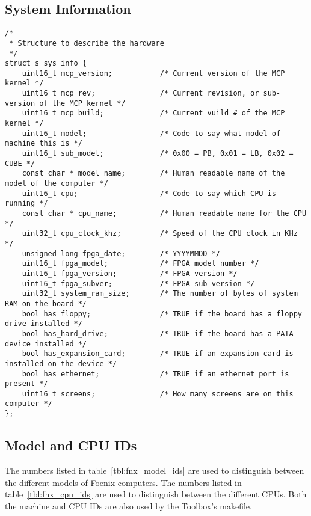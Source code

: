 \subsection*{System Information}
\begin{lstlisting}
/*
 * Structure to describe the hardware
 */
struct s_sys_info {
    uint16_t mcp_version;     		/* Current version of the MCP kernel */
    uint16_t mcp_rev;         		/* Current revision, or sub-version of the MCP kernel */
    uint16_t mcp_build;       		/* Current vuild # of the MCP kernel */
    uint16_t model;           		/* Code to say what model of machine this is */
    uint16_t sub_model;         	/* 0x00 = PB, 0x01 = LB, 0x02 = CUBE */
    const char * model_name;        /* Human readable name of the model of the computer */
    uint16_t cpu;             		/* Code to say which CPU is running */
    const char * cpu_name;          /* Human readable name for the CPU */
    uint32_t cpu_clock_khz;     	/* Speed of the CPU clock in KHz */
    unsigned long fpga_date;        /* YYYYMMDD */    
    uint16_t fpga_model;       		/* FPGA model number */
    uint16_t fpga_version;    		/* FPGA version */
    uint16_t fpga_subver;     		/* FPGA sub-version */
    uint32_t system_ram_size;		/* The number of bytes of system RAM on the board */
    bool has_floppy;                /* TRUE if the board has a floppy drive installed */
    bool has_hard_drive;            /* TRUE if the board has a PATA device installed */
    bool has_expansion_card;        /* TRUE if an expansion card is installed on the device */
    bool has_ethernet;              /* TRUE if an ethernet port is present */
    uint16_t screens;         		/* How many screens are on this computer */
};
\end{lstlisting}

\subsection*{Model and CPU IDs}
The numbers listed in table~\ref{tbl:fnx_model_ids} are used to distinguish between the different models of Foenix computers.
The numbers listed in table~\ref{tbl:fnx_cpu_ids} are used to distinguish between the different CPUs.
Both the machine and CPU IDs are also used by the Toolbox's makefile.

